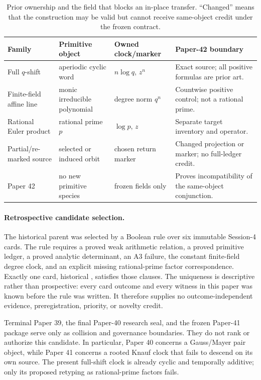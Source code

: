 \begin{table}[t]
\centering
\small
\caption{Prior ownership and the field that blocks an in-place transfer.
“Changed” means that the construction may be valid but cannot receive
same-object credit under the frozen contract.}
\label{tab:prior-ownership}
\begin{tabularx}{\textwidth}{@{}
  >{\raggedright\arraybackslash}p{}
  >{\raggedright\arraybackslash}p{}
  >{\raggedright\arraybackslash}p{}Y@{}}
\toprule
Family & Primitive object & Owned clock/marker & Paper-42 boundary \\
\midrule
Full $q$-shift & aperiodic cyclic word & $n\log q$, $z^n$ & Exact source; all positive formulas are prior art. \\
Finite-field affine line & monic irreducible polynomial & degree norm $q^n$ & Countwise positive control; not a rational prime. \\
Rational Euler product & rational prime $p$ & $\log p$, $z$ & Separate target inventory and operator. \\
Partial/re-marked source & selected or induced orbit & chosen return marker & Changed projection or marker; no full-ledger credit. \\
Paper 42 & no new primitive species & frozen fields only & Proves incompatibility of the same-object conjunction. \\
\bottomrule
\end{tabularx}
\end{table}

\paragraph{Retrospective candidate selection.}
The historical parent was selected by a Boolean rule over six immutable
Session-4 cards. The rule requires a proved weak arithmetic relation, a proved
primitive ledger, a proved analytic determinant, an A3 failure, the constant
finite-field degree clock, and an explicit missing rational-prime factor
correspondence. Exactly one card, historical , satisfies those
clauses. The uniqueness is descriptive rather than prospective: every card
outcome and every witness in this paper was known before the rule was written.
It therefore supplies no outcome-independent evidence, preregistration,
priority, or novelty credit.

Terminal Paper 39, the final Paper-40 research seal, and the frozen Paper-41
package serve only as collision and governance boundaries. They do not rank
or authorize this candidate. In particular, Paper 40 concerns a Gauss/Mayer
pair object, while Paper 41 concerns a rooted Knauf clock that fails to
descend on its own source. The present full-shift clock is already cyclic and
temporally additive; only its proposed retyping as rational-prime factors
fails.

